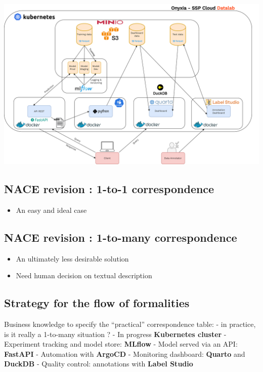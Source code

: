 \documentclass[
  letterpaper,
  DIV=11,
  numbers=noendperiod]{scrartcl}
\providecommand{\tightlist}{%
  \setlength{\itemsep}{0pt}\setlength{\parskip}{0pt}}\usepackage{longtable,booktabs,array}
\begin{document}
\begin{center}
\includegraphics{../img/annotation-datalab.png}
\end{center}

\subsection{NACE revision : 1-to-1
correspondence}\label{nace-revision-1-to-1-correspondence}

\begin{itemize}
\tightlist
\item
  An easy and ideal case
\end{itemize}

\subsection{NACE revision : 1-to-many
correspondence}\label{nace-revision-1-to-many-correspondence}

\begin{itemize}
\tightlist
\item
  An ultimately less desirable solution
\item
  Need human decision on textual description
\end{itemize}

\subsection{Strategy for the flow of
formalities}\label{strategy-for-the-flow-of-formalities}

Business knowledge to specify the ``practical'' correspondence table: -
in practice, is it really a 1-to-many situation ? - In progress
{\textbf{Kubernetes cluster}} - Experiment tracking and model store:
{\textbf{MLflow}} - Model served via an API: {\textbf{FastAPI}} -
Automation with {\textbf{ArgoCD}} - Monitoring dashboard:
{\textbf{Quarto}} and {\textbf{DuckDB}} - Quality control: annotations
with {\textbf{Label Studio}}
\end{document}
